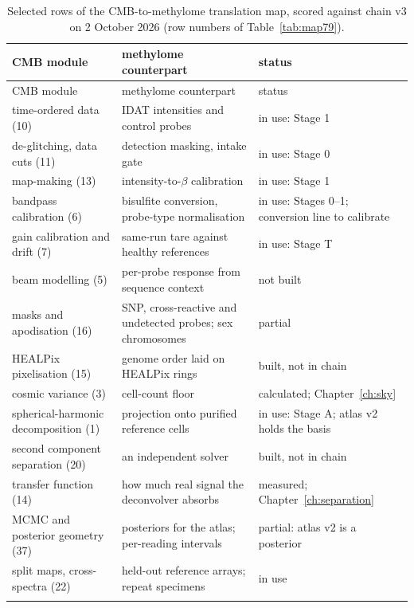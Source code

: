\begin{center}\small
\begin{longtable}{@{}p{}p{}p{}@{}}
\caption{Selected rows of the CMB-to-methylome translation map, scored against chain v3 on 2 October 2026 (row numbers of
Table~\ref{tab:map79}).}\label{tab:cmbmap}\\
\toprule CMB module & methylome counterpart & status \\\midrule\endfirsthead
\toprule CMB module & methylome counterpart & status \\\midrule\endhead
time-ordered data (10) & IDAT intensities and control probes & in use: Stage 1 \\ \rowrule
de-glitching, data cuts (11) & detection masking, intake gate & in use: Stage 0 \\ \rowrule
map-making (13) & intensity-to-$\beta$ calibration & in use: Stage 1 \\ \rowrule
bandpass calibration (6) & bisulfite conversion, probe-type normalisation & in use: Stages 0--1; conversion line to calibrate \\ \rowrule
gain calibration and drift (7) & same-run tare against healthy references & in use: Stage T \\ \rowrule
beam modelling (5) & per-probe response from sequence context & not built \\ \rowrule
masks and apodisation (16) & SNP, cross-reactive and undetected probes; sex chromosomes & partial \\ \rowrule
HEALPix pixelisation (15) & genome order laid on HEALPix rings & built, not in chain \\ \rowrule
cosmic variance (3) & cell-count floor & calculated; Chapter~\ref{ch:sky} \\ \rowrule
spherical-harmonic decomposition (1) & projection onto purified reference cells & in use: Stage A; atlas v2 holds the basis \\ \rowrule
second component separation (20) & an independent solver & built, not in chain \\ \rowrule
transfer function (14) & how much real signal the deconvolver absorbs & measured; Chapter~\ref{ch:separation} \\ \rowrule
MCMC and posterior geometry (37) & posteriors for the atlas; per-reading intervals & partial: atlas v2 is a posterior \\ \rowrule
split maps, cross-spectra (22) & held-out reference arrays; repeat specimens & in use \\ \rowrule

\end{longtable}
\end{center}

